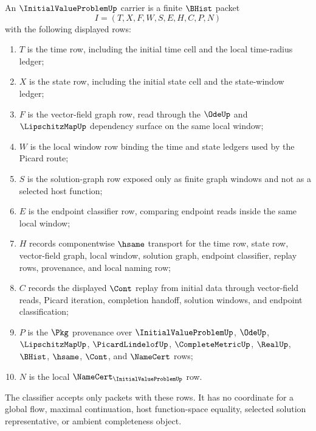 \begin{definition}
\label{def:initial-value-problem-carrier}
An $\InitialValueProblemUp$ carrier is a finite $\BHist$ packet
$$
I=(T,X,F,W,S,E,H,C,P,N)
$$
with the following displayed rows:
\begin{enumerate}
\item $T$ is the time row, including the initial time cell and the local time-radius ledger;
\item $X$ is the state row, including the initial state cell and the state-window ledger;
\item $F$ is the vector-field graph row, read through the $\OdeUp$ and $\LipschitzMapUp$ dependency surface on the same local window;
\item $W$ is the local window row binding the time and state ledgers used by the Picard route;
\item $S$ is the solution-graph row exposed only as finite graph windows and not as a selected host function;
\item $E$ is the endpoint classifier row, comparing endpoint reads inside the same local window;
\item $H$ records componentwise $\hsame$ transport for the time row, state row, vector-field graph, local window, solution graph, endpoint classifier, replay rows, provenance, and local naming row;
\item $C$ records the displayed $\Cont$ replay from initial data through vector-field reads, Picard iteration, completion handoff, solution windows, and endpoint classification;
\item $P$ is the $\Pkg$ provenance over $\InitialValueProblemUp$, $\OdeUp$, $\LipschitzMapUp$, $\PicardLindelofUp$, $\CompleteMetricUp$, $\RealUp$, $\BHist$, $\hsame$, $\Cont$, and $\NameCert$ rows;
\item $N$ is the local $\NameCert_{\InitialValueProblemUp}$ row.
\end{enumerate}
The classifier accepts only packets with these rows. It has no coordinate for a global flow, maximal continuation, host function-space equality, selected solution representative, or ambient completeness object.
\end{definition}


